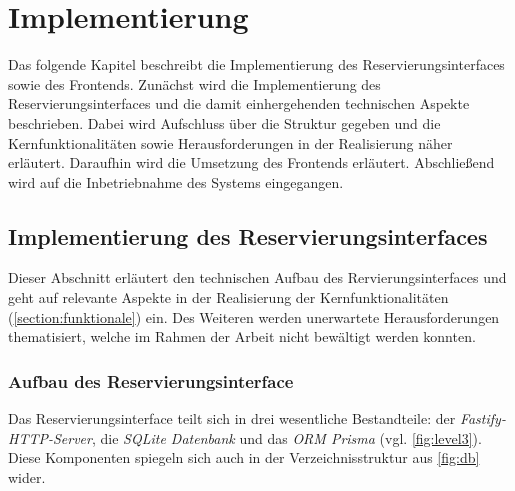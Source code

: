 
\chapter{Implementierung}
\label{chapter-implementierung}
Das folgende Kapitel beschreibt die Implementierung des Reservierungsinterfaces sowie des Frontends.
Zunächst wird die Implementierung des Reservierungsinterfaces und die damit einhergehenden
technischen Aspekte beschrieben. Dabei wird Aufschluss über die Struktur gegeben und die
Kernfunktionalitäten sowie Herausforderungen in der Realisierung
näher erläutert. Daraufhin wird die Umsetzung des Frontends erläutert. Abschließend wird auf die
Inbetriebnahme des Systems eingegangen.




\section{Implementierung des Reservierungsinterfaces}
Dieser Abschnitt erläutert den technischen Aufbau des Rervierungsinterfaces und geht auf relevante
Aspekte in der Realisierung der Kernfunktionalitäten (\ref{section:funktionale}) ein. Des Weiteren
werden unerwartete Herausforderungen thematisiert, welche im Rahmen der Arbeit nicht bewältigt
werden konnten.


\subsection{Aufbau des Reservierungsinterface}
Das Reservierungsinterface teilt sich in drei wesentliche Bestandteile: der
\textit{Fastify-HTTP-Server}, die \textit{SQLite Datenbank} und das \textit{ORM Prisma} (vgl.
\ref{fig:level3}). Diese Komponenten spiegeln sich auch in der Verzeichnisstruktur aus \ref{fig:db}
wider.

